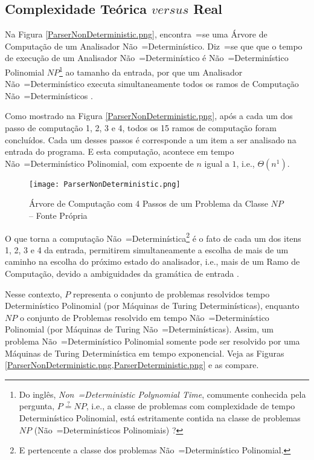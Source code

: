 \subsection{Complexidade Teórica $versus$ Real}

    Na Figura \autoref{ParserNonDeterministic.png},
    encontra~=se uma Árvore de Computação de um Analisador Não~=Determinístico.
    Diz~=se que que o tempo de execução de um Analisador Não~=Determinístico é Não~=Determinístico Polinomial $NP$\footnote{
    Do inglês, \textit{Non~=Deterministic Polynomial Time},
    comumente conhecida pela pergunta,
    $P \stackrel{?}{=} NP$, i.e.,
    a classe de problemas com complexidade de tempo Determinístico Polinomial,
    está estritamente contida na classe de problemas $NP$ (Não~=Determinísticos Polinomiais) \cite{computationalComplexityAuroraBarak}?
    }
    ao tamanho da entrada,
    por que um Analisador Não~=Determinístico executa simultaneamente todos os ramos de Computação Não~=Determinísticos \cite{hopcroftBook}.

    Como mostrado na Figura \autoref{ParserNonDeterministic.png},
    após a cada um dos passo de computação 1,
    2, 3 e 4,
    todos os 15 ramos de computação foram concluídos.
    Cada um desses passos é corresponde a um item a ser analisado na entrada do programa.
    E esta computação,
    acontece em tempo Não~=Determinístico Polinomial,
    com expoente de $n$ igual a $1$,
    i.e.,
    $\Theta(n^1)$.
    \begin{figure}[h]
    \centering
    \texttt{[image: ParserNonDeterministic.png]}
    \caption[Árvore de Computação com 4 Passos de um Problema da Classe $NP$]{Árvore de Computação com 4 Passos de um Problema da Classe $NP$ -- Fonte Própria}
    \label{ParserNonDeterministic.png}
    \end{figure}

    O que torna a computação Não~=Determinística\footnote{
    E pertencente a classe dos problemas Não~=Determinístico Polinomial.
    } é o fato de cada um dos itens 1,
    2, 3 e 4 da entrada,
    permitirem simultaneamente a escolha de mais de um caminho na escolha do próximo estado do analisador,
    i.e.,
    mais de um Ramo de Computação,
    devido a ambiguidades da gramática de entrada \cite{antlrBookTerrentParr}.

    Nesse contexto,
    $P$ representa o conjunto de problemas resolvidos tempo Determinístico Polinomial (por Máquinas de Turing Determinísticas),
    enquanto $NP$ o conjunto de Problemas resolvido em tempo Não~=Determinístico Polinomial (por Máquinas de Turing Não~=Determinísticas).
    Assim,
    um problema Não~=Determinístico Polinomial somente pode ser resolvido por uma Máquinas de Turing Determinística em tempo exponencial.
    Veja as Figuras \autoref{ParserNonDeterministic.png,ParserDeterministic.png} e
    as compare.

